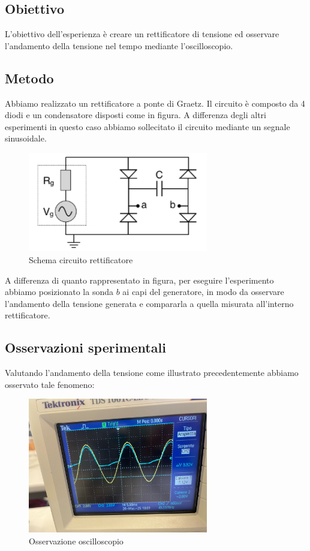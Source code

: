 \documentclass[a4paper]{article}
\begin{document}
\subsection{Obiettivo}
L'obiettivo dell'esperienza è creare un rettificatore di tensione ed osservare l'andamento della tensione nel tempo mediante l'oscilloscopio.

\subsection{Metodo}
Abbiamo realizzato un rettificatore a ponte di Graetz. Il circuito è composto da 4 diodi e un condensatore disposti come in figura. A differenza degli altri esperimenti in questo caso abbiamo sollecitato il circuito mediante un segnale sinusoidale.

\begin{figure}[htbp]
    \centering
    \includegraphics[width=0.7\textwidth]{grafici/image.png}
    \caption{Schema circuito rettificatore}
    \label{fig:rettificatore}
\end{figure}

A differenza di quanto rappresentato in figura, per eseguire l'esperimento abbiamo posizionato la sonda $b$ ai capi del generatore, in modo da osservare l'andamento della tensione generata e compararla a quella misurata all'interno rettificatore. 
\subsection{Osservazioni sperimentali}
Valutando l'andamento della tensione come illustrato precedentemente abbiamo osservato tale fenomeno:

\begin{figure}[htbp]
    \centering
    \includegraphics[width=0.7\textwidth]{grafici/rett_osc.jpg}
    \caption{Osservazione oscilloscopio}
    \label{fig:oscilloscopio}
\end{figure}
\end{document}
